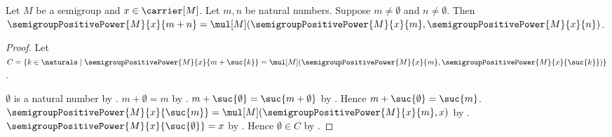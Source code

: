 \begin{theorem}\label{semigroup_positive_power_addition}
    Let $M$ be a semigroup and $x\in\carrier[M]$.
    Let $m,n$ be natural numbers.
    Suppose $m\neq\emptyset$ and $n\neq\emptyset$.
    Then $\semigroupPositivePower{M}{x}{m+n}
        =\mul[M](\semigroupPositivePower{M}{x}{m},
            \semigroupPositivePower{M}{x}{n})$.
\end{theorem}
\begin{proof}
    Let $C=\{k\in\naturals\mid
        \text{$\semigroupPositivePower{M}{x}{m+\suc{k}}
            =\mul[M](\semigroupPositivePower{M}{x}{m},
                \semigroupPositivePower{M}{x}{\suc{k}})$}\}$.

    $\emptyset$ is a natural number by .
    $m+\emptyset=m$ by .
    $m+\suc{\emptyset}=\suc{m+\emptyset}$ by
        .
    Hence $m+\suc{\emptyset}=\suc{m}$.
    $\semigroupPositivePower{M}{x}{\suc{m}}
        =\mul[M](\semigroupPositivePower{M}{x}{m},x)$ by
        .
    $\semigroupPositivePower{M}{x}{\suc{\emptyset}}=x$ by
        .
    Hence $\emptyset\in C$ by .


\end{proof}
